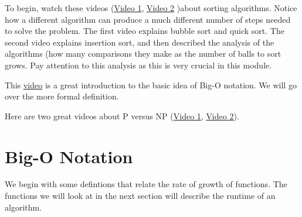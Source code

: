 To begin, watch these videos (\href{https://www.youtube.com/watch?v=aXXWXz5rF64}{Video 1}, \href{https://youtu.be/TZRWRjq2CAg}{Video 2} )about sorting algorithms.  Notice how a different algorithm can produce a much different number of steps needed to solve the problem.  The first video explains bubble sort and quick sort. The second video explains insertion sort, and then described the analysis of the algorithms (how many comparisons they make as the number of balls to sort grows.    Pay attention to this analysis as this is very crucial in this module.



           

This \href{https://youtu.be/__vX2sjlpXU}{video} is a great introduction to the basic idea of Big-O notation.  We will go over the more formal definition.

    

Here are two great videos about P versus NP (\href{https://youtu.be/EHp4FPyajKQ}{Video 1}, \href{https://youtu.be/YX40hbAHx3s}{Video 2}).  
%

         


%
%

\section{Big-O Notation}
We begin with some defintions that relate the rate of growth of functions.   The functions we will look at in the next section will describe the runtime of an algorithm.  



